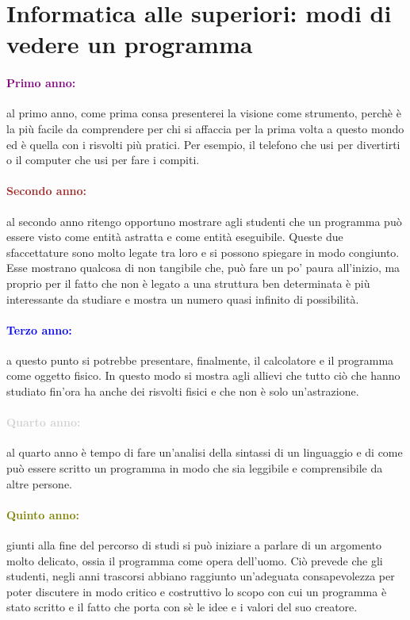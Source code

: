 \section{Informatica alle superiori: modi di vedere un programma}

\paragraph{\textcolor{purple}{Primo anno:}} al primo anno, come prima consa
presenterei la visione come strumento, perchè è la più facile da comprendere
per chi si affaccia per la prima volta a questo mondo ed è quella con i risvolti
più pratici. Per esempio, il telefono che usi per divertirti o il computer che usi
per fare i compiti.

\paragraph{\textcolor{brown}{Secondo anno:}} al secondo anno ritengo opportuno
mostrare agli studenti che un programma può essere visto come entità astratta e
come entità eseguibile. Queste due sfaccettature sono molto legate tra loro e
si possono spiegare in modo congiunto. Esse mostrano qualcosa di non tangibile che,
può fare un po' paura all'inizio, ma proprio per il fatto che non è legato a una struttura
ben determinata è più interessante da studiare e mostra un numero quasi infinito di
possibilità. 

\paragraph{\textcolor{blue}{Terzo anno:}} a questo punto si potrebbe presentare,
finalmente, il calcolatore e il programma come oggetto fisico. In questo modo
si mostra agli allievi che tutto ciò che hanno studiato fin'ora ha anche dei risvolti
fisici e che non è solo un'astrazione.
 
\paragraph{\textcolor{lightgray}{Quarto anno:}} al quarto anno è tempo di
fare un'analisi della sintassi di un linguaggio e di come può essere scritto
un programma in modo che sia leggibile e comprensibile da altre persone.

\paragraph{\textcolor{olive}{Quinto anno:}} giunti alla fine del percorso
di studi si può iniziare a parlare di un argomento molto delicato, ossia
il programma come opera dell'uomo. Ciò prevede che gli studenti, negli anni
trascorsi abbiano raggiunto un'adeguata consapevolezza per poter discutere in
modo critico e costruttivo lo scopo con cui un programma è stato scritto e
il fatto che porta con sè le idee e i valori del suo creatore.
